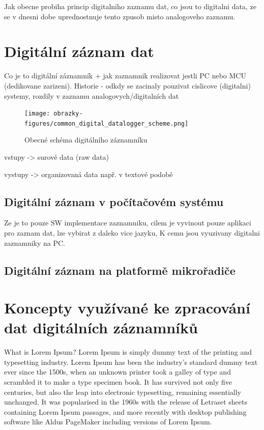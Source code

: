 Jak obecne probiha princip digitalniho zaznamu dat, co jsou to digitalni data, ze se v dnesni dobe uprednostnuje tento zpusob misto analogoveho zaznamu.

\section{Digitální záznam dat}
\label{digitalni_zaznamnik}
Co je to digitální záznamník + jak zaznamnik realizovat jestli PC nebo MCU (dedikovane zarizeni). Historie - odkdy se zacinaly pouzivat cislicove (digitalni) systemy, rozdily v zaznamu 
analogovych/digitalních dat

\begin{figure}[h] %
    \centering
    \texttt{[image: obrazky-figures/common\_digital\_datalogger\_scheme.png]}
    \caption{Obecné schéma digitálního záznamníku}
    \label{fig:polygraaf}
\end{figure}
vstupy -> surové data (raw data)

vystupy -> organizovaná data např. v textové podobě

\subsection{Digitální záznam v počítačovém systému}
Ze je to pouze SW implementace zaznamniku, cilem je vyvinout pouze aplikaci pro zaznam dat, lze vybirat z daleko vice jazyku, K cemu jsou vyuzivany digitalni zaznamniky na PC.

\subsection{Digitální záznam na platformě mikrořadiče}

\section{Koncepty využívané ke zpracování dat digitálních záznamníků}
What is Lorem Ipsum?
Lorem Ipsum is simply dummy text of the printing and typesetting industry. Lorem Ipsum has been the industry's standard dummy text ever since the 1500s, when an unknown printer took a galley of type and scrambled it to make a type specimen book. It has survived not only five centuries, but also the leap into electronic typesetting, remaining essentially unchanged. It was popularised in the 1960s with the release of Letraset sheets containing Lorem Ipsum passages, and more recently with desktop publishing software like Aldus PageMaker including versions of Lorem Ipsum.

